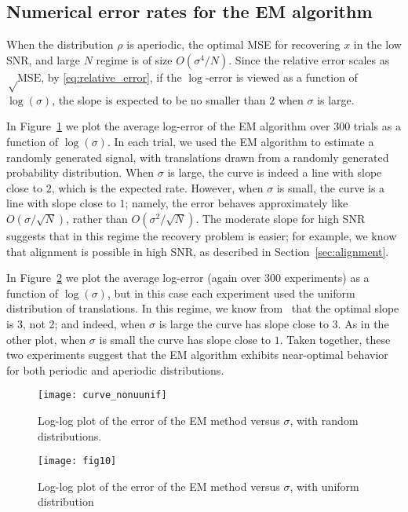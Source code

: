 \documentclass{IEEEtran}
\numberwithin{equation}{section}
\numberwithin{figure}{section}
\theoremstyle{plain}
\theoremstyle{definition}
\theoremstyle{remark}
\theoremstyle{plain}
\theoremstyle{remark}
\theoremstyle{plain}
\theoremstyle{plain}
\theoremstyle{remark}
\newcommand{\MSE}{\mathrm{MSE}}
\begin{document}
\subsection{Numerical error rates for the EM algorithm}

When the distribution $\rho$ is aperiodic, the optimal MSE for recovering $x$ in the low SNR, and large $N$ regime is of size $O(\sigma^4 / N)$. Since the relative error scales as $\sqrt \MSE$, by \eqref{eq:relative_error}, if the $\log$-error is viewed as a function of $\log(\sigma)$, the slope is expected to be no smaller than $2$ when $\sigma$ is large.

In Figure~\ref{fig-err} we plot the average log-error of the EM algorithm over $300$ trials as a function of $\log(\sigma)$. In each trial, we used the EM algorithm to estimate a randomly generated signal, with translations drawn from a randomly generated probability distribution. When $\sigma$ is large, the curve is indeed a line with slope close to $2$, which is the expected rate. However, when $\sigma$ is small, the curve is a line with slope close to $1$; namely, the error behaves approximately like $O(\sigma/\sqrt{N})$, rather than $O(\sigma^2/\sqrt{N})$. The moderate slope for high SNR suggests that in this regime the recovery problem is easier; for example, we know that alignment is possible in high SNR, as described in Section~\ref{sec:alignment}.

In Figure~\ref{fig-err2} we plot the average log-error (again over $300$ experiments) as a function of $\log(\sigma)$, but in this case each experiment used the uniform distribution of translations. In this regime, we know from~\cite{bandeira2017optimal} that the optimal slope is 3, not 2; and indeed, when $\sigma$ is large the curve has slope close to $3$. As in the other plot, when $\sigma$ is small the curve has slope close to $1$. Taken together, these two experiments suggest that the EM algorithm exhibits near-optimal behavior for both periodic and aperiodic distributions.


%
%
\begin{figure}[ht]
    \centerline{
        \texttt{[image: curve\_nonuunif]}
    }
    \caption{Log-log plot of the error of the EM method versus $\sigma$, with random distributions.}
    \label{fig-err}
\end{figure}


%
%
\begin{figure}[ht]
    \centerline{
        \texttt{[image: fig10]}
    }
    \caption{Log-log plot of the error of the EM method versus $\sigma$, with uniform distribution}
    \label{fig-err2}
\end{figure}
\end{document}
